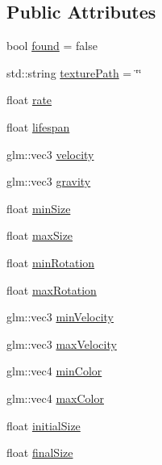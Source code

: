 \subsection*{Public Attributes}
\begin{DoxyCompactItemize}
\item 
bool \hyperlink{class_mason_1_1_particle_descriptor_a4e686866e2431ae666800ead5d1638c4}{found} = false
\item 
std\+::string \hyperlink{class_mason_1_1_particle_descriptor_a060bb2c95075b3a19432beca816bfa76}{texture\+Path} = \char`\"{}\char`\"{}
\item 
float \hyperlink{class_mason_1_1_particle_descriptor_a250f9c2c5b3fa119d0a38311e301fd2a}{rate}
\item 
float \hyperlink{class_mason_1_1_particle_descriptor_ac38adbef0e6dfa77dd42ade2089595fc}{lifespan}
\item 
glm\+::vec3 \hyperlink{class_mason_1_1_particle_descriptor_a015f949d8089667eea16540fb750f70a}{velocity}
\item 
glm\+::vec3 \hyperlink{class_mason_1_1_particle_descriptor_abd5c0046bb19ee434c56f713c58103c3}{gravity}
\item 
float \hyperlink{class_mason_1_1_particle_descriptor_a5bbc1147b832c903cee0b6ebe964d8c3}{min\+Size}
\item 
float \hyperlink{class_mason_1_1_particle_descriptor_a394842f237899eb5fcd3091c8dd2ba89}{max\+Size}
\item 
float \hyperlink{class_mason_1_1_particle_descriptor_a086f4988188e22f066e93529cb02608c}{min\+Rotation}
\item 
float \hyperlink{class_mason_1_1_particle_descriptor_a9590c7ad32834d9cce9c24d530e75609}{max\+Rotation}
\item 
glm\+::vec3 \hyperlink{class_mason_1_1_particle_descriptor_a6412dbc10bc67e2e8b21faef1c050a67}{min\+Velocity}
\item 
glm\+::vec3 \hyperlink{class_mason_1_1_particle_descriptor_afc679429239c6e9c40b5c2e75228e2c1}{max\+Velocity}
\item 
glm\+::vec4 \hyperlink{class_mason_1_1_particle_descriptor_a86b3ee8f533d314ed0f0e48228144a25}{min\+Color}
\item 
glm\+::vec4 \hyperlink{class_mason_1_1_particle_descriptor_aa755ad8771cf25c71ec868e16cff41e2}{max\+Color}
\item 
float \hyperlink{class_mason_1_1_particle_descriptor_aebf2ee5b2a1b72e03e010d66a1ccf054}{initial\+Size}
\item 
float \hyperlink{class_mason_1_1_particle_descriptor_ad865ce5734085951e7c1ec384389ca4b}{final\+Size}

\end{DoxyCompactItemize}
